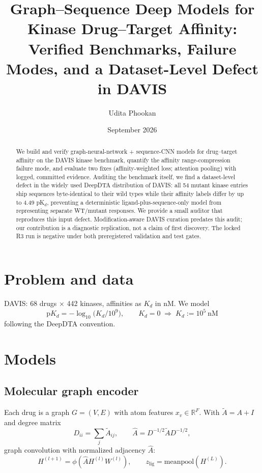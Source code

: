 \documentclass[11pt]{article}
\title{Graph--Sequence Deep Models for Kinase Drug--Target Affinity:\\
Verified Benchmarks, Failure Modes, and a Dataset-Level Defect in DAVIS}
\author{Udita Phookan}
\date{September 2026}
\begin{document}
\maketitle
\begin{abstract}
We build and verify graph-neural-network + sequence-CNN models for
drug--target affinity on the DAVIS kinase benchmark, quantify the
affinity range-compression failure mode, and evaluate two fixes
(affinity-weighted loss; attention pooling) with logged, committed
evidence. Auditing the benchmark itself, we find a dataset-level defect
in the widely used DeepDTA distribution of DAVIS: all 54 mutant kinase
entries ship sequences byte-identical to their wild types while their
affinity labels differ by up to 4.49 pK$_d$, preventing a deterministic ligand-plus-sequence-only model from
representing separate WT/mutant responses. We provide a small auditor that reproduces this input defect. Modification-aware DAVIS curation predates this audit; our contribution is a diagnostic replication, not a claim of first discovery. The locked R3 run is negative under both preregistered validation and test gates.
\end{abstract}

\section{Problem and data}
DAVIS: 68 drugs $\times$ 442 kinases, affinities as $K_d$ in nM. We model
\begin{equation}
  \mathrm{p}K_d = -\log_{10}\!\big(K_d / 10^{9}\big), \qquad
  K_d = 0 \;\Rightarrow\; K_d := 10^{5}\ \mathrm{nM}
\end{equation}
following the DeepDTA convention.

\section{Models}
\subsection{Molecular graph encoder}
Each drug is a graph $G=(V,E)$ with atom features $x_v \in \mathbb{R}^{F}$.
With $\tilde A = A + I$ and degree matrix
\begin{equation}
  D_{ii} = \sum_{j} \tilde A_{ij}, \qquad \hat A = D^{-1/2} \tilde A D^{-1/2},
\end{equation}
graph convolution with normalized adjacency $\hat A$:
\begin{equation}
  H^{(l+1)} = \phi\!\left( \hat A H^{(l)} W^{(l)} \right), \qquad
  z_{\mathrm{lig}} = \mathrm{meanpool}(H^{(L)}) .
\end{equation}
\end{document}
